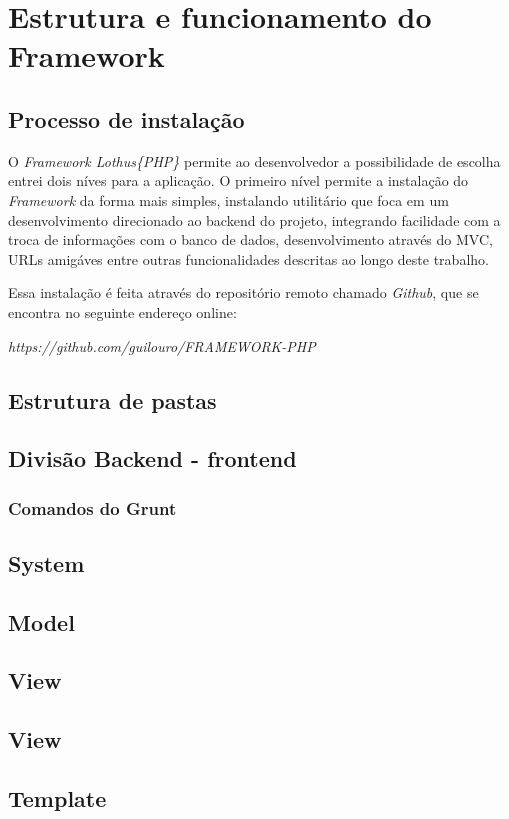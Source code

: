 \chapter{Estrutura e funcionamento do Framework\label{cap:detalhamento-projeto}}

    \section{Processo de instalação\label{sec:processo-instalacao}}
        O \emph{Framework Lothus\{PHP\}} permite ao desenvolvedor a possibilidade de escolha entrei dois níves para a aplicação. O primeiro nível permite a instalação do \emph{Framework} da forma mais simples, instalando utilitário que foca em um desenvolvimento direcionado ao backend do projeto, integrando facilidade com a troca de informações com o banco de dados, desenvolvimento através do MVC, URLs amigáves entre outras funcionalidades descritas ao longo deste trabalho.

        Essa instalação é feita através do repositório remoto chamado \emph{Github}, que se encontra no seguinte endereço online:

        \emph{https://github.com/guilouro/FRAMEWORK-PHP}




    \section{Estrutura de pastas\label{sec:estrutura-pastas}}

    \section{Divisão Backend - frontend\label{sec:back-front}}

        \subsection{Comandos do Grunt\label{sub:comandos-grunt}}

    \section{System\label{sec:estrutura-pastas}}

    \section{Model\label{sec:estrutura-pastas}}

    \section{View\label{sec:estrutura-pastas}}

    \section{View\label{sec:estrutura-pastas}}

    \section{Template\label{sec:estrutura-pastas}}
